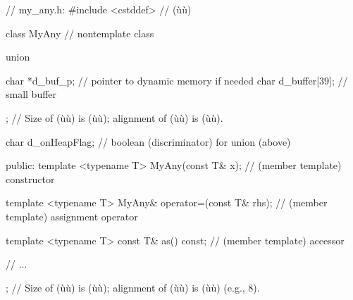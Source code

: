 %
%
%
%
%
%
%
%
\begin{emcppslisting}[emcppsbatch=e2]
// my_any.h:
#include <cstddef>  // (ù{}ù)

class MyAny  // nontemplate class
{
    union {
        char *d_buf_p;       // pointer to dynamic memory if needed
        char  d_buffer[39];  // small buffer

    };  // Size of (ù{}ù) is (ù{}ù); alignment of (ù{}ù) is (ù{}ù).

    char d_onHeapFlag;             // boolean (discriminator) for union (above)

public:
    template <typename T>
    MyAny(const T& x);               // (member template) constructor

    template <typename T>
    MyAny& operator=(const T& rhs);  // (member template) assignment operator

    template <typename T>
    const T& as() const;             // (member template) accessor

    // ...

};  // Size of (ù{}ù) is (ù{}ù); alignment of (ù{}ù) is (ù{}ù) (e.g., 8).
\end{emcppslisting}

